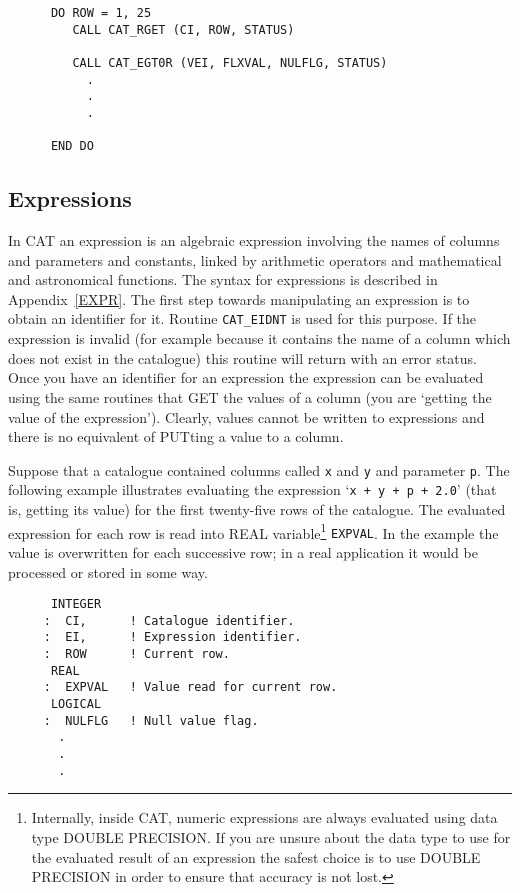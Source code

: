 \begin{verbatim}
      DO ROW = 1, 25
         CALL CAT_RGET (CI, ROW, STATUS)

         CALL CAT_EGT0R (VEI, FLXVAL, NULFLG, STATUS)
           .
           .
           .

      END DO
\end{verbatim}


\subsection{Expressions}

In CAT an expression is an algebraic expression involving the names of
columns and parameters and constants, linked by arithmetic operators and
mathematical and astronomical functions. The syntax for expressions is
described in Appendix~\ref{EXPR}. The first step towards manipulating an
expression is to obtain an identifier for it. Routine {\tt CAT\_EIDNT}
is used for this purpose. If the expression is invalid (for example
because it contains the name of a column which does not exist in the
catalogue) this routine will return with an error status. Once you have
an identifier for an expression the expression can be evaluated using
the same routines that GET the values of a column (you are `getting the
value of the expression'). Clearly, values cannot be written to
expressions and there is no equivalent of PUTting a value to a column.

Suppose that a catalogue contained columns called {\tt x} and {\tt y}
and parameter {\tt p}. The following example illustrates evaluating the
expression `{\tt x + y + p + 2.0}' (that is, getting its value) for the
first twenty-five rows of the catalogue. The evaluated expression for
each row is read into REAL variable\footnote{Internally, inside CAT,
numeric expressions are always evaluated using data type DOUBLE
PRECISION. If you are unsure about the data type to use for the
evaluated result of an expression the safest choice is to use DOUBLE
PRECISION in order to ensure that accuracy is not lost.} {\tt EXPVAL}.
In the example the value is overwritten for each successive row; in a
real application it would be processed or stored in some way.

\begin{verbatim}
      INTEGER
     :  CI,      ! Catalogue identifier.
     :  EI,      ! Expression identifier.
     :  ROW      ! Current row.
      REAL
     :  EXPVAL   ! Value read for current row.
      LOGICAL
     :  NULFLG   ! Null value flag.
       .
       .
       .
\end{verbatim}

